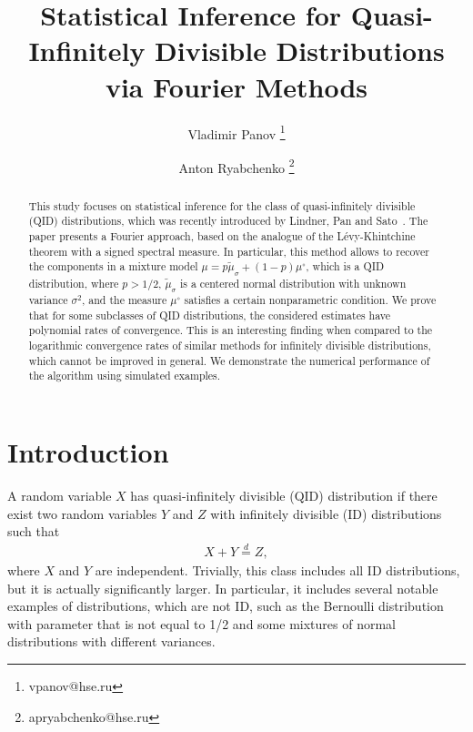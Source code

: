 \documentclass[a4paper,11pt]{article}
\title{Statistical Inference for Quasi-Infinitely Divisible Distributions via Fourier Methods} %
\author[1]{Vladimir Panov \thanks{vpanov@hse.ru}}
\author[2]{Anton Ryabchenko \thanks{apryabchenko@hse.ru}}
\affil[1,2]{HSE University,
Pokrovsky boulevard 11, 109028 Moscow, Russia}
\theoremstyle{definition}
\newcommand{\eqd}{\stackrel{d}{=}}
\newcommand{\1}{\mathbb{I}}
\theoremstyle{remark}
\begin{document}
\maketitle
\begin{abstract}
This study focuses on statistical inference for the class of quasi-infinitely divisible  (QID) distributions, which was  recently introduced by Lindner, Pan and Sato~\cite{LPS2018}.  The paper presents a Fourier approach, based on the analogue of the L{\'e}vy-Khintchine theorem with a signed spectral measure. In particular, this method allows to recover the components in a mixture model \(\mu=p  \tilde\mu_{\sigma} + (1-p) \mu^\circ\),  which is a QID distribution, where \(p>1/2\), \(\tilde\mu_\sigma\) is a centered normal distribution with unknown variance \(\sigma^2\), and the measure \(\mu^\circ\) satisfies a certain nonparametric condition. We prove that for some subclasses of QID distributions, the considered estimates have polynomial rates of convergence. This is an interesting finding when compared to the logarithmic convergence rates of similar methods for infinitely divisible distributions, which cannot be improved in general. We demonstrate the numerical performance of the algorithm using simulated examples. \end{abstract}


\section{Introduction} 
A random variable \(X\) has quasi-infinitely divisible (QID) distribution if there exist two random variables \(Y\) and \(Z\) with infinitely divisible (ID) distributions such that \begin{eqnarray}\label{def1}
X+Y \eqd Z,
\end{eqnarray} where \(X\) and \(Y\) are independent. Trivially, this class includes all ID distributions, but it is actually significantly larger. In particular, it includes several notable examples of distributions, which are not ID, such as the Bernoulli distribution with parameter that is not equal to 1/2 and some mixtures of normal distributions with different variances.
\end{document}
